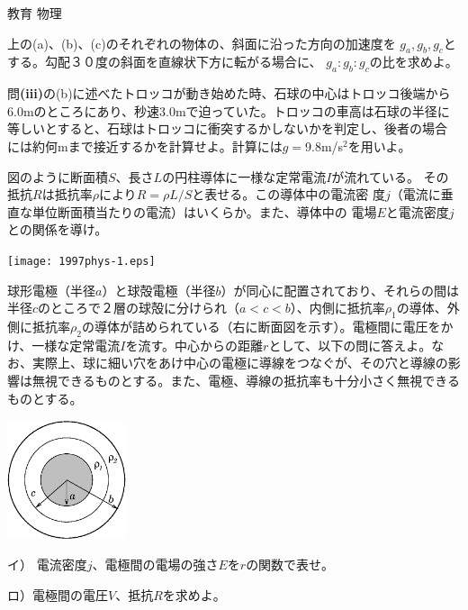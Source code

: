 \documentclass[fleqn]{jbook}
\begin{document}
\begin{question}{教育 物理}{}
\begin{subquestions}
\begin{subsubquestions}
上の(a)、(b)、(c)のそれぞれの物体の、斜面に沿った方向の加速度を
$g_a,g_b,g_c$とする。勾配３０度の斜面を直線状下方に転がる場合に、
$g_a:g_b:g_c$の比を求めよ。

\SubSubQuestion
問{\bf (iii)}の(b)に述べたトロッコが動き始めた時、石球の中心はトロッコ後端から
6.0mのところにあり、秒速3.0mで迫っていた。トロッコの車高は石球の半径に
等しいとすると、石球はトロッコに衝突するかしないかを判定し、後者の場合
には約何mまで接近するかを計算せよ。計算には$g=$9.8m/s$^2$を用いよ。

\end{subsubquestions}

\SubQuestion

\begin{subsubquestions}
\SubSubQuestion
図のように断面積$S$、長さ$L$の円柱導体に一様な定常電流$I$が流れている。
その抵抗$R$は抵抗率$\rho$により$R=\rho L/S$と表せる。この導体中の電流密
度$j$（電流に垂直な単位断面積当たりの電流）はいくらか。また、導体中の
電場$E$と電流密度$j$との関係を導け。

\begin{center}
\texttt{[image: 1997phys-1.eps]}
\end{center}

\SubSubQuestion
\parbox[t]{110mm}{
球形電極（半径$a$）と球殻電極（半径$b$）が同心に配置されており、それらの間は半径$c$のところで２層の球殻に分けられ（$a<c<b$）、内側に抵抗率$\rho_1$の導体、外側に抵抗率$\rho_2$の導体が詰められている（右に断面図を示す）。電極間に電圧をかけ、一様な定常電流$I$を流す。中心からの距離$r$として、以下の問に答えよ。なお、実際上、球に細い穴をあけ中心の電極に導線をつなぐが、その穴と導線の影響は無視できるものとする。また、電極、導線の抵抗率も十分小さく無視できるものとする。}\parbox[t]{50mm}{\vspace*{-5mm}
\begin{center}
\includegraphics[clip,height=35mm,width=35mm]{1997phys-2.eps}
\end{center}
}

イ） 電流密度$j$、電極間の電場の強さ$E$を$r$の関数で表せ。

ロ）電極間の電圧$V$、抵抗$R$を求めよ。


\end{subsubquestions}
\end{subquestions}
\end{question}
\end{document}
